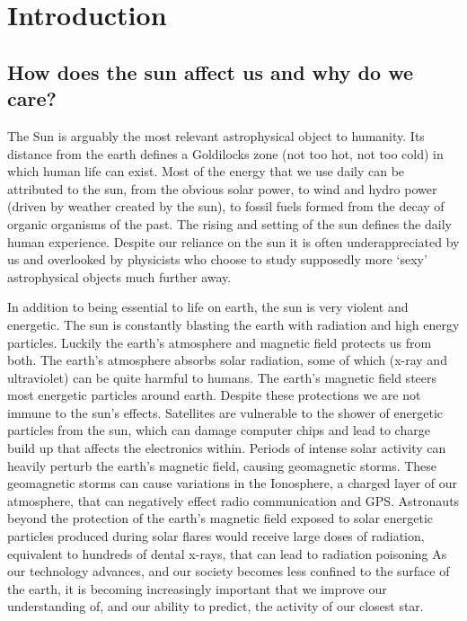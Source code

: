 \chapter{Introduction}\label{CH:introduction}


\section{How does the sun affect us and why do we care?}
The Sun is arguably the most relevant astrophysical object to humanity.
Its distance from the earth defines a Goldilocks zone (not too hot, not too cold) in which human life can exist.
Most of the energy that we use daily can be attributed to the sun, from the obvious solar power, to wind and hydro power (driven by weather created by the sun), to fossil fuels formed from the decay of organic organisms of the past.
The rising and setting of the sun defines the daily human experience.
Despite our reliance on the sun it is often underappreciated by us and overlooked by physicists who choose to study supposedly more `sexy' astrophysical objects much further away.

In addition to being essential to life on earth, the sun is very violent and energetic.
The sun is constantly blasting the earth with radiation and high energy particles.
Luckily the earth's atmosphere and magnetic field protects us from both.
The earth's atmosphere absorbs  solar radiation, some of which (x-ray and ultraviolet) can be quite harmful to humans.
The earth's magnetic field steers most energetic particles around earth.
Despite these protections we are not immune to the sun's effects.
Satellites are vulnerable to the shower of energetic particles from the sun, which can damage computer chips and lead to charge build up that affects the electronics within.
Periods of intense solar activity can heavily perturb the earth's magnetic field, causing geomagnetic storms.
These geomagnetic storms can cause variations in the Ionosphere, a charged layer of our atmosphere, that can negatively effect radio communication and GPS.
Astronauts beyond the protection of the earth's magnetic field exposed to solar energetic particles produced during solar flares would receive large doses of radiation, equivalent to hundreds of dental x-rays, that can lead to radiation poisoning \citep[][and references therein]{Temmer2021}
As our technology advances, and our society becomes less confined to the surface of the earth, it is becoming increasingly important that we improve our understanding of, and our ability to predict, the activity of our closest star.

